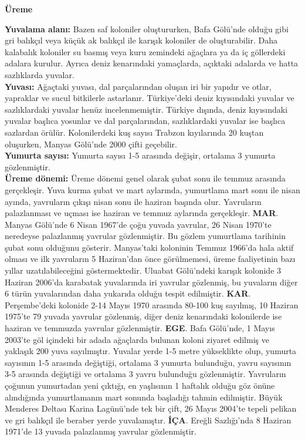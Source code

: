 \documentclass[
  letterpaper,
  DIV=11,
  numbers=noendperiod]{scrreprt}
\begin{document}
\textbf{Üreme}

\textbf{Yuvalama alanı:} Bazen saf koloniler oluştururken, Bafa Gölü'nde
olduğu gibi gri balıkçıl veya küçük ak balıkçıl ile karışık koloniler de
oluşturabilir. Daha kalabalık koloniler su basmış veya kuru zemindeki
ağaçlara ya da iç göllerdeki adalara kurulur. Ayrıca deniz kenarındaki
yamaçlarda, açıktaki adalarda ve hatta sazlıklarda yuvalar.\\
\textbf{Yuvası:} Ağaçtaki yuvası, dal parçalarından oluşan iri bir
yapıdır ve otlar, yapraklar ve sucul bitkilerle astarlanır. Türkiye'deki
deniz kıyısındaki yuvalar ve sazlıklardaki yuvalar henüz
incelenmemiştir. Türkiye dışında, deniz kıyısındaki yuvalar başlıca
yosunlar ve dal parçalarından, sazlıklardaki yuvalar ise başlıca
sazlardan örülür. Kolonilerdeki kuş sayısı Trabzon kıyılarında 20 kuştan
oluşurken, Manyas Gölü'nde 2000 çifti geçebilir.\\
\textbf{Yumurta sayısı:} Yumurta sayısı 1-5 arasında değişir, ortalama 3
yumurta gözlenmiştir.\\
\textbf{Üreme dönemi:} Üreme dönemi genel olarak şubat sonu ile temmuz
arasında gerçekleşir. Yuva kurma şubat ve mart aylarında, yumurtlama
mart sonu ile nisan ayında, yavruların çıkışı nisan sonu ile haziran
başında olur. Yavruların palazlanması ve uçması ise haziran ve temmuz
aylarında gerçekleşir. \textbf{MAR}. Manyas Gölü'nde 6 Nisan 1967'de
çoğu yuvada yavrular, 26 Nisan 1970'te neredeyse palazlanmış yavrular
gözlenmiştir. Bu gözlem yumurtlama tarihinin şubat sonu olduğunu
gösterir. Manyas'taki koloninin Temmuz 1966'da hala aktif olması ve ilk
yavruların 5 Haziran'dan önce görülmemesi, üreme faaliyetinin bazı
yıllar uzatılabileceğini göstermektedir. Uluabat Gölü'ndeki karışık
kolonide 3 Haziran 2006'da karabatak yuvalarında iri yavrular gözlenmiş,
bu yuvaların diğer 6 türün yuvalarından daha yukarıda olduğu tespit
edilmiştir. \textbf{KAR}. Perşembe'deki kolonide 2-14 Mayıs 1970
arasında 80-100 kuş sayılmış, 10 Haziran 1975'te 79 yuvada yavrular
gözlenmiş, diğer deniz kenarındaki kolonilerde ise haziran ve temmuzda
yavrular gözlenmiştir. \textbf{EGE}. Bafa Gölü'nde, 1 Mayıs 2003'te göl
içindeki bir adada ağaçlarda bulunan koloni ziyaret edilmiş ve yaklaşık
200 yuva sayılmıştır. Yuvalar yerde 1-5 metre yükseklikte olup, yumurta
sayısının 1-5 arasında değiştiği, ortalama 3 yumurta bulunduğu, yavru
sayısının 3-5 arasında değiştiği ve ortalama 3 yavru bulunduğu
gözlenmiştir. Yavruların çoğunun yumurtadan yeni çıktığı, en yaşlısının
1 haftalık olduğu göz önüne alındığında yumurtlamanın mart sonunda
başladığı tahmin edilmiştir. Büyük Menderes Deltası Karina Lagünü'nde
tek bir çift, 26 Mayıs 2004'te tepeli pelikan ve gri balıkçıl ile
beraber yerde yuvalamıştır. \textbf{İÇA}. Ereğli Sazlığı'nda 8 Haziran
1971'de 13 yuvada palazlanmış yavrular gözlenmiştir.
\end{document}
